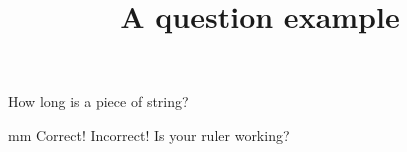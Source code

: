 \documentclass[hidesidemenu]{webquiz}
\title{A question example}
\begin{document}
  \begin{question}     %
     How long is a piece of string?

      mm%
     \whenRight Correct!
     \whenWrong Incorrect! Is your ruler working?
  \end{question}
\end{document}
